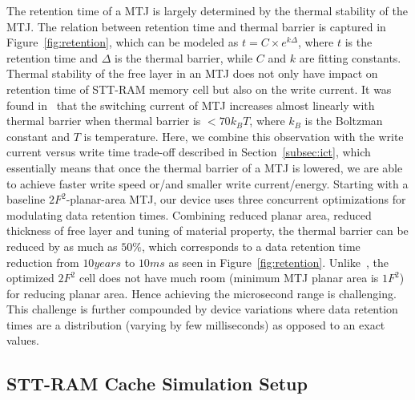 The retention time of a MTJ is largely determined by the thermal stability of the MTJ. The relation between retention time and thermal barrier is captured in Figure~\ref{fig:retention}, which can be modeled as $t=C\times e^{k\Delta}$, where $t$ is the retention time and $\Delta$ is the thermal barrier, while $C$ and $k$ are fitting constants. Thermal stability of the free layer in an MTJ does not only have impact on retention time of STT-RAM memory cell but also on the write current. It was found in~\cite{PMTJ:Toshiba08} that the switching current of MTJ increases almost linearly with thermal barrier when thermal barrier is $<70k_{B}T$, where $k_{B}$ is the Boltzman constant and $T$ is temperature. Here, we combine this observation with the write current versus write time trade-off described in Section~\ref{subsec:ict}, which essentially means that once the thermal barrier of a MTJ is lowered, we are able to achieve faster write speed or/and smaller write current/energy. Starting with a baseline $2F^2$-planar-area MTJ, our device uses three concurrent optimizations for modulating data retention times. Combining reduced planar area, reduced thickness of free layer and tuning of material property, the thermal barrier can be reduced by as much as $50\%$, which corresponds to a data retention time reduction from $10years$ to $10ms$ as seen in Figure~\ref{fig:retention}. Unlike~\cite{STTRAM:HPCA11}, the optimized $2F^2$ cell does not have much room (minimum MTJ planar area is $1F^2$) for reducing planar area. Hence achieving the microsecond range is challenging. This challenge is further compounded by device variations where data retention times are a distribution (varying by few milliseconds) as opposed to an exact values.

\subsection{STT-RAM Cache Simulation Setup}

